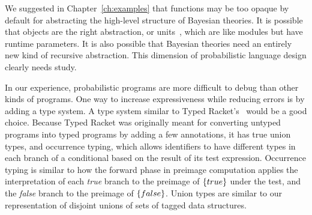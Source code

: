 We suggested in Chapter~\ref{ch:examples} that functions may be too opaque by default for abstracting the high-level structure of Bayesian theories.
It is possible that objects are the right abstraction, or units~\cite{cit:findler-1998icfp-units}, which are like modules but have runtime parameters.
It is also possible that Bayesian theories need an entirely new kind of recursive abstraction.
This dimension of probabilistic language design clearly needs study.

\begin{comment}
Besides adding direct support for distributions traditionally used in Bayesian modeling such as the gamma distribution, we would like to directly support so-called nonparametric modeling.
The motivation behind nonparametric theories is extremely flexible inference.
Their common feature is selecting among infinitely many theories; for example, fitting a polynomial of any degree or even a general $\Re \to \Re$ function to observed data.
Their prior distributions are typically infinite-dimensional, meaning that
\begin{itemize}
	\item They are developed by people who know measure theory because they have no density models.
	\item 
\end{itemize}

many can be written as recursive programs that produce lazy lists; e.g. the Chinese Restaurant process

flexible priors

parameterizing 

Dirichlet, Gaussian

Brownian motion and other time-series

direct support for functions with infinite domains (e.g. $\Nat$, $\Rat$ or $\Re$)

XXX: by measurability theorem, classical nondeterminism with at most countably many choices is compatible with probabilistic theories

\end{comment}

In our experience, probabilistic programs are more difficult to debug than other kinds of programs.
One way to increase expressiveness while reducing errors is by adding a type system.
A type system similar to Typed Racket's~\cite{cit:tobin-hochstadt-2008popl-typed-scheme} would be a good choice.
Because Typed Racket was originally meant for converting untyped programs into typed programs by adding a few annotations, it has true union types, and occurrence typing, which allows identifiers to have different types in each branch of a conditional based on the result of its test expression.
Occurrence typing is similar to how the forward phase in preimage computation applies the interpretation of each \emph{true} branch to the preimage of $\{{true}\}$ under the test, and the \emph{false} branch to the preimage of $\{{false}\}$.
Union types are similar to our representation of disjoint unions of sets of tagged data structures.

